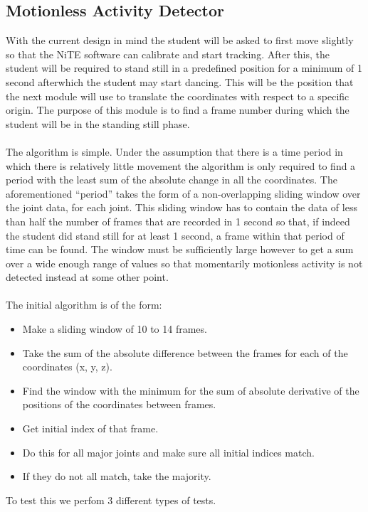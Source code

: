 \documentclass[10pt]{article}
\begin{document}
\subsection{Motionless Activity Detector}
\noindent 
With the current design in mind the student will be asked to first move slightly so that the NiTE software can calibrate and start tracking. After this, the student will be required to stand still in a predefined position for a minimum of 1 second afterwhich the student may start dancing. This will be the position that the next module will use to translate the coordinates with respect to a specific origin. The purpose of this module is to find a frame number during which the student will be in the standing still phase.\\\\
\noindent 
The algorithm is simple. Under the assumption that there is a time period in which there is relatively little movement the algorithm is only required to find a period with the least sum of the absolute change in all the coordinates. The aforementioned ``period'' takes the form of a non-overlapping sliding window over the joint data, for each joint. This sliding window has to contain the data of less than half the number of frames that are recorded in 1 second so that, if indeed the student did stand still for at least 1 second, a frame within that period of time can be found. The window must be sufficiently large however to get a sum over a wide enough range of values so that momentarily motionless activity is not detected instead at some other point.\\\\
\noindent
The initial algorithm is of the form:
\begin{itemize}
\setlength{\itemsep}{1pt}
\setlength{\parskip}{0pt}
\setlength{\parsep}{0pt}
	\item Make a sliding window of 10 to 14 frames.
	\item Take the sum of the absolute difference between the frames for each of the coordinates (x, y, z).
	\item Find the window with the minimum for the sum of absolute derivative of the positions of the coordinates between frames.
	\item Get initial index of that frame.
\item Do this for all major joints and make sure all initial indices match.
\item If they do not all match, take the majority. 
\end{itemize}
\noindent
To test this we perfom 3 different types of tests.
\end{document}
